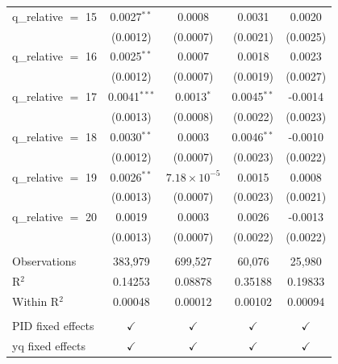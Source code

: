 \begin{tabular}{lcccc}
   q\_relative $=$ 15   & 0.0027$^{**}$         & 0.0008                 & 0.0031        & 0.0020\\   
                        & (0.0012)              & (0.0007)               & (0.0021)      & (0.0025)\\   
   q\_relative $=$ 16   & 0.0025$^{**}$         & 0.0007                 & 0.0018        & 0.0023\\   
                        & (0.0012)              & (0.0007)               & (0.0019)      & (0.0027)\\   
   q\_relative $=$ 17   & 0.0041$^{***}$        & 0.0013$^{*}$           & 0.0045$^{**}$ & -0.0014\\   
                        & (0.0013)              & (0.0008)               & (0.0022)      & (0.0023)\\   
   q\_relative $=$ 18   & 0.0030$^{**}$         & 0.0003                 & 0.0046$^{**}$ & -0.0010\\   
                        & (0.0012)              & (0.0007)               & (0.0023)      & (0.0022)\\   
   q\_relative $=$ 19   & 0.0026$^{**}$         & $7.18\times 10^{-5}$   & 0.0015        & 0.0008\\   
                        & (0.0013)              & (0.0007)               & (0.0023)      & (0.0021)\\   
   q\_relative $=$ 20   & 0.0019                & 0.0003                 & 0.0026        & -0.0013\\   
                        & (0.0013)              & (0.0007)               & (0.0022)      & (0.0022)\\   
    \\
   Observations         & 383,979               & 699,527                & 60,076        & 25,980\\  
   R$^2$                & 0.14253               & 0.08878                & 0.35188       & 0.19833\\  
   Within R$^2$         & 0.00048               & 0.00012                & 0.00102       & 0.00094\\  
    \\
   PID fixed effects    & $\checkmark$          & $\checkmark$           & $\checkmark$  & $\checkmark$\\   
   yq fixed effects     & $\checkmark$          & $\checkmark$           & $\checkmark$  & $\checkmark$\\   
   \bottomrule
\end{tabular}
\par\endgroup


